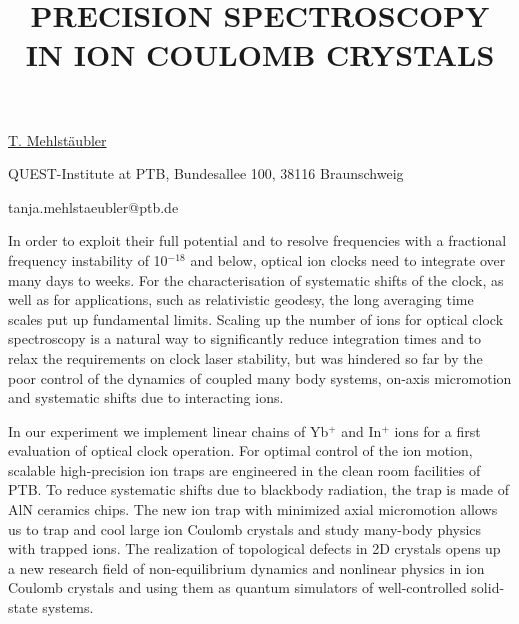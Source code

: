 \title{PRECISION SPECTROSCOPY IN ION COULOMB CRYSTALS}

\underline{T. Mehlst\"{a}ubler} 

{\normalsize{\vspace{-4mm}
QUEST-Institute at PTB,
Bundesallee 100,
38116 Braunschweig

\email tanja.mehlstaeubler@ptb.de}}

In order to exploit their full potential and to resolve frequencies with a fractional frequency instability of 10$^{-18}$ and below, optical ion clocks need to integrate over many days to weeks. For the characterisation of systematic shifts of the clock, as well as for applications, such as relativistic geodesy, the long averaging time scales put up fundamental limits. Scaling up the number of ions for optical clock spectroscopy is a natural way to significantly reduce integration times and to relax the requirements on clock laser stability, but was hindered so far by the poor control of the dynamics of coupled many body systems, on-axis micromotion and systematic shifts due to interacting ions.

In our experiment we implement linear chains of Yb$^+$ and In$^+$ ions for a first evaluation of optical clock operation. For optimal control of the ion motion, scalable high-precision ion traps are engineered in the clean room facilities of PTB. To reduce systematic shifts due to blackbody radiation, the trap is made of AlN ceramics chips. The new ion trap with minimized axial micromotion allows us to trap and cool large ion Coulomb crystals and study many-body physics with trapped ions. The realization of topological defects in 2D crystals opens up a new research field of non-equilibrium dynamics and nonlinear physics in ion Coulomb crystals and using them as quantum simulators of well-controlled solid-state systems.

%
%



\vspace{\baselineskip} 